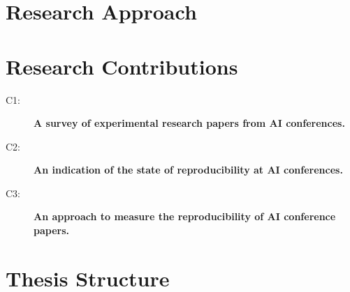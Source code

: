 \section{Research Approach}
\section{Research Contributions}

\begin{description}
    \item[C1:] \textbf{A survey of experimental research papers from AI conferences.}
    \item[C2:] \textbf{An indication of the state of reproducibility at AI conferences.}
    \item[C3:] \textbf{An approach to measure the reproducibility of AI conference papers.}
\end{description}

\section{Thesis Structure}

\cleardoublepage
